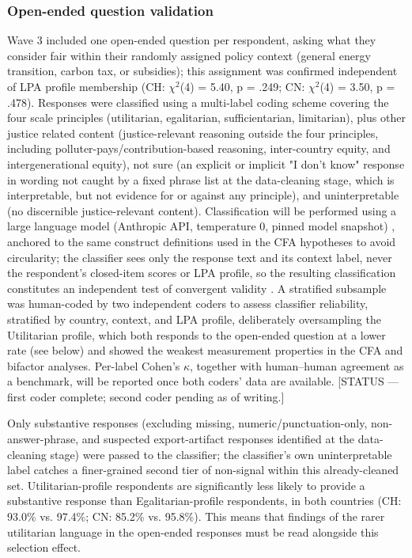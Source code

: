 \documentclass[10pt,letterpaper]{article}
\begin{document}
\subsubsection*{Open-ended question validation}
Wave 3 included one open-ended question per respondent, asking what they consider fair within their randomly assigned policy context (general energy transition, carbon tax, or subsidies); this assignment was confirmed independent of LPA profile membership (CH: $\chi^2$(4) = 5.40, p = .249; CN: $\chi^2$(4) = 3.50, p = .478).
Responses were classified using a multi-label coding scheme covering the four scale principles (utilitarian, egalitarian, sufficientarian, limitarian), plus other justice related content (justice-relevant reasoning outside the four principles, including polluter-pays/contribution-based reasoning, inter-country equity, and intergenerational equity), not sure (an explicit or implicit "I don't know" response in wording not caught by a fixed phrase list at the data-cleaning stage, which is interpretable, but not evidence for or against any principle), and uninterpretable (no discernible justice-relevant content).
Classification will be performed using a large language model (Anthropic API, temperature 0, pinned model snapshot) \autocite{kostina2025,vajjala2025,tripp2024}, anchored to the same construct definitions used in the CFA hypotheses to avoid circularity; the classifier sees only the response text and its context label, never the respondent's closed-item scores or LPA profile, so the resulting classification constitutes an independent test of convergent validity \autocite{zollinger2024a}.
A stratified subsample was human-coded by two independent coders to assess classifier reliability, stratified by country, context, and LPA profile, deliberately oversampling the Utilitarian profile, which both responds to the open-ended question at a lower rate (see below) and showed the weakest measurement properties in the CFA and bifactor analyses. Per-label Cohen's $\kappa$, together with human–human agreement as a benchmark, will be reported once both coders' data are available.
[STATUS — first coder complete; second coder pending as of writing.]

Only substantive responses (excluding missing, numeric/punctuation-only, non-answer-phrase, and suspected export-artifact responses identified at the data-cleaning stage) were passed to the classifier; the classifier's own uninterpretable label catches a finer-grained second tier of non-signal within this already-cleaned set.
Utilitarian-profile respondents are significantly less likely to provide a substantive response than Egalitarian-profile respondents, in both countries (CH: 93.0\% vs. 97.4\%; CN: 85.2\% vs. 95.8\%).
This means that findings of the rarer utilitarian language in the open-ended responses must be read alongside this selection effect.
\end{document}
